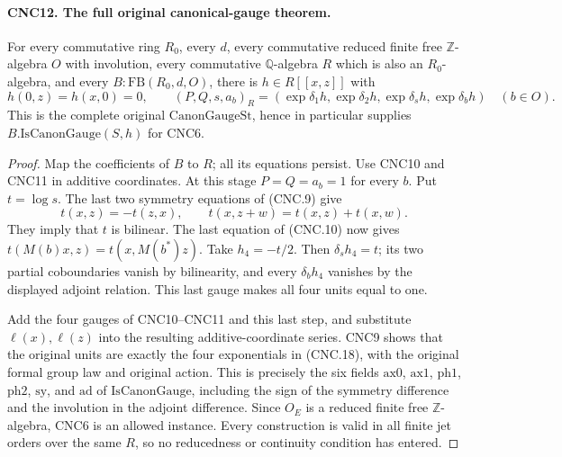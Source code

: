 \documentclass[11pt,a4paper]{article}
\numberwithin{equation}{section}
\theoremstyle{remark}\newtheorem{remark}[theorem]{Remark}
\begin{document}
\paragraph{CNC12. The full original canonical-gauge theorem.}
\label{claim:CNC12}
For every commutative ring \(R_0\), every \(d\), every commutative
reduced finite free \(\mathbb Z\)-algebra \(O\) with involution,
every commutative \(\mathbb Q\)-algebra \(R\) which is also an
\(R_0\)-algebra, and every \(B:\mathrm{FB}(R_0,d,O)\), there is
\(h\in R[[x,z]]\) with
\[
 h(0,z)=h(x,0)=0,\qquad
 (P,Q,s,a_b)_R
   =(\exp\delta_1h,\exp\delta_2h,
      \exp\delta_sh,\exp\delta_bh)\quad(b\in O).              \tag{CNC.18}
\]
This is the complete original \(\mathrm{CanonGaugeSt}\), hence in
particular supplies \(B.\mathrm{IsCanonGauge}(S,h)\) for CNC6.
\begin{proof}
Map the coefficients of \(B\) to \(R\); all its equations persist.
Use CNC10 and CNC11 in additive coordinates.  At this stage
\(P=Q=a_b=1\) for every \(b\).  Put \(t=\log s\).
The last two symmetry equations of (CNC.9) give
\[
 t(x,z)=-t(z,x),\qquad t(x,z+w)=t(x,z)+t(x,w).
\]
They imply that \(t\) is bilinear.  The last equation of (CNC.10)
now gives \(t(M(b)x,z)=t(x,M(b^*)z)\).
Take \(h_4=-t/2\).  Then
\(\delta_sh_4=t\); its two partial coboundaries vanish by
bilinearity, and every \(\delta_bh_4\) vanishes by the displayed
adjoint relation.  This last gauge makes all four units equal to one.

Add the four gauges of CNC10--CNC11 and this last step, and substitute
\(\ell(x),\ell(z)\) into the resulting additive-coordinate
series.  CNC9 shows that the original units are exactly the four
exponentials in (CNC.18), with the original formal group law and
original action.  This is precisely the six fields \(\mathrm{ax0}\),
\(\mathrm{ax1}\), \(\mathrm{ph1}\), \(\mathrm{ph2}\),
\(\mathrm{sy}\), and \(\mathrm{ad}\) of
\(\mathrm{IsCanonGauge}\), including the sign of the symmetry
difference and the involution in the adjoint difference.  Since \(O_E\)
is a reduced finite free \(\mathbb Z\)-algebra, CNC6 is an allowed
instance.  Every construction is valid in all finite jet orders over
the same \(R\), so no reducedness or continuity condition has entered.
\end{proof}

\end{document}

